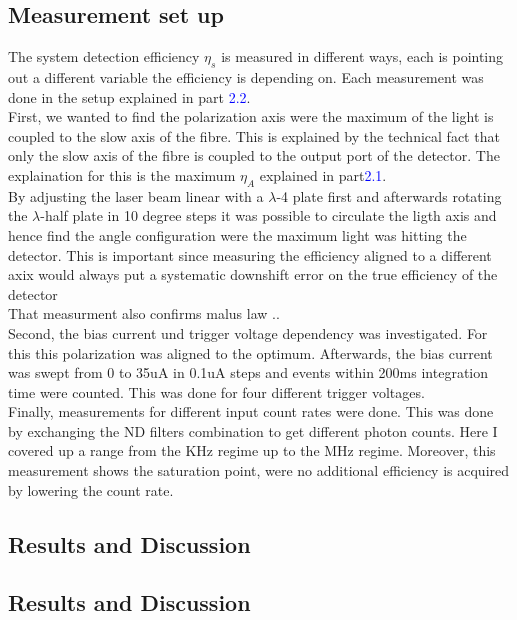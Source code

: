 \subsection*{Measurement set up}

The system detection efficiency $\eta_{s}$ is measured in different ways, each is pointing out a different variable
the efficiency is depending on. Each measurement was done in the setup explained in part \textcolor{blue}{2.2}.
\\

First, we wanted to find the polarization axis were the maximum of the light is coupled to the slow axis of the fibre.
This is explained by the technical fact that only the slow axis of the fibre is coupled to the output port of the
detector. The explaination for this is the maximum $\eta_{A}$ explained in part\textcolor{blue}{2.1}.\\
By adjusting the laser beam linear with a $\lambda$-4 plate first and afterwards rotating the $\lambda$-half plate
in 10 degree steps it was possible to circulate the ligth axis and hence find the angle configuration were the maximum
light was hitting the detector.
This is important since measuring the efficiency aligned to a different axix would always
put a systematic downshift error on the true efficiency of the detector\\

That measurment also confirms malus law ..\\

Second, the bias current und trigger voltage dependency was investigated.
For this this polarization was aligned to the optimum.
Afterwards, the bias current was swept from 0 to 35uA in 0.1uA steps and events within 200ms integration
time were counted. This was done for four different trigger voltages. \\

Finally, measurements for different input count rates were done.
This was done by exchanging the ND filters combination to get different photon counts.
Here I covered up a range from the KHz regime up to the MHz regime.
Moreover, this measurement shows the saturation point, were no additional efficiency is acquired by lowering the count rate.


\subsection*{Results and Discussion}

\subsection*{Results and Discussion}
